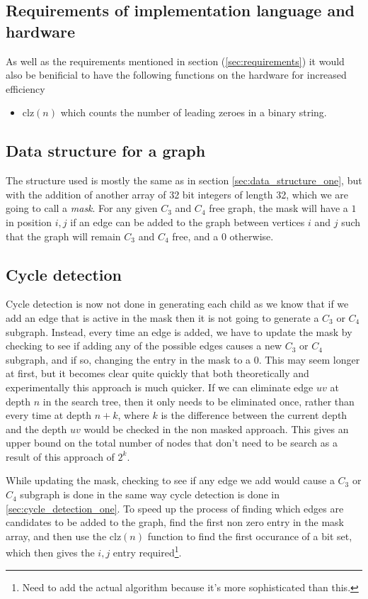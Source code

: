 \documentclass[a4paper]{article}
\newcommand{\clz}{\text{clz}}
\begin{document}
\subsection{Requirements of implementation language and hardware}
As well as the requirements mentioned in section (\ref{sec:requirements}) it would also be benificial to have the following functions on the hardware for increased efficiency
\begin{itemize}
\item $\clz(n)$ which counts the number of leading zeroes in a binary string.
\end{itemize}

\subsection{Data structure for a graph}
The structure used is mostly the same as in section \ref{sec:data_structure_one}, but with the addition of another array of 32 bit integers of length 32, which we are going to call a \emph{mask}. For any given $C_3$ and $C_4$ free graph, the mask will have a $1$ in position $i,j$ if an edge can be added to the graph between vertices $i$ and $j$ such that the graph will remain $C_3$ and $C_4$ free, and a $0$ otherwise.

\subsection{Cycle detection}
Cycle detection is now not done in generating each child as we know that if we add an edge that is active in the mask then it is not going to generate a $C_3$ or $C_4$ subgraph. Instead, every time an edge is added, we have to update the mask by checking to see if adding any of the possible edges causes a new $C_3$ or $C_4$ subgraph, and if so, changing the entry in the mask to a 0. This may seem longer at first, but it becomes clear quite quickly that both theoretically and experimentally this approach is much quicker. If we can eliminate edge $uv$ at depth $n$ in the search tree, then it only needs to be eliminated once, rather than every time at depth $n+k$, where $k$ is the difference between the current depth and the depth $uv$ would be checked in the non masked approach. This gives an upper bound on the total number of nodes that don't need to be search as a result of this approach of $2^k$.

While updating the mask, checking to see if any edge we add would cause a $C_3$ or $C_4$ subgraph is done in the same way cycle detection is done in \ref{sec:cycle_detection_one}. To speed up the process of finding which edges are candidates to be added to the graph, find the first non zero entry in the mask array, and then use the $\clz(n)$ function to find the first occurance of a bit set, which then gives the $i,j$ entry required\footnote{Need to add the actual algorithm because it's more sophisticated than this.}. 
\end{document}
